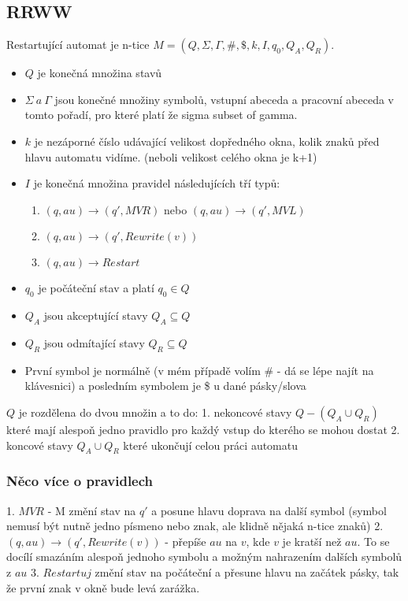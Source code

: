 \documentclass{article}
\begin{document}
	\subsection{RRWW}
	Restartující automat je n-tice $M =  (Q ,\Sigma, \Gamma, \# , \$, k ,I ,q_0, Q_A, Q_R)$.
	\begin{itemize}
		\item  $Q$ je konečná množina stavů
		\item  $\Sigma  \ a \ \Gamma$ jsou konečné množiny symbolů, vstupní abeceda a pracovní abeceda v tomto pořadí, pro které platí že sigma subset of gamma.
		\item  $k$ je nezáporné číslo udávající velikost dopředného okna, kolik znaků před hlavu automatu vidíme. (neboli velikost celého okna je k+1)
		\item  $I$ je konečná množina pravidel následujících tří typů:
			\begin{enumerate}
				\item $(q, au) \to (q',MVR)$ nebo $(q, au) \to (q',MVL)$
				\item $(q, au)\to(q', Rewrite(v))$
				\item $(q, au) \to Restart$
			\end{enumerate}
		\item  $q_0$ je počáteční stav a platí $q_0 \in Q$
		\item  $Q_A$ jsou akceptující stavy $Q_A \subseteq Q$
		\item  $Q_R$ jsou odmítající stavy $Q_R \subseteq Q$
		\item  První symbol je normálně \cent (v mém případě volím \# - dá se lépe najít na klávesnici) a posledním symbolem je \$ u dané pásky/slova
	\end{itemize}

	$Q$ je rozdělena do dvou množin a to do:
	1. nekoncové stavy $Q - (Q_A \cup Q_R)$ které mají alespoň jedno pravidlo pro každý vstup do kterého se mohou dostat
	2. koncové stavy $Q_A \cup Q_R$ které ukončují celou práci automatu

		\subsubsection{Něco více o pravidlech}
		1. $MVR$ - M změní stav na $q'$ a posune hlavu doprava na další symbol (symbol nemusí být nutně jedno písmeno nebo znak, ale klidně nějaká n-tice znaků)
		2. $(q, au)\to(q', Rewrite(v))$ - přepíše $au$ na $v$, kde $v$ je kratší než $au$. To se docílí smazáním alespoň jednoho symbolu a možným nahrazením dalších symbolů z $au$
		3.  $Restartuj$ změní stav na počáteční a přesune hlavu na začátek pásky, tak že první znak v okně bude levá zarážka.
\end{document}
